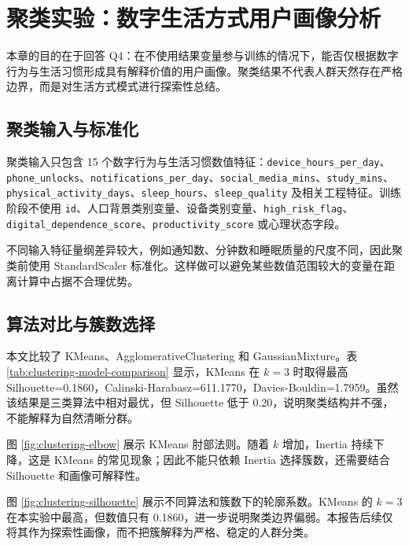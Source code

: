 \section{聚类实验：数字生活方式用户画像分析}

本章的目的在于回答 Q4：在不使用结果变量参与训练的情况下，能否仅根据数字行为与生活习惯形成具有解释价值的用户画像。聚类结果不代表人群天然存在严格边界，而是对生活方式模式进行探索性总结。

\subsection{聚类输入与标准化}

聚类输入只包含 15 个数字行为与生活习惯数值特征：\texttt{device\_hours\_per\_day}、\texttt{phone\_unlocks}、\texttt{notifications\_per\_day}、\texttt{social\_media\_mins}、\texttt{study\_mins}、\texttt{physical\_activity\_days}、\texttt{sleep\_hours}、\texttt{sleep\_quality} 及相关工程特征。训练阶段不使用 \texttt{id}、人口背景类别变量、设备类别变量、\texttt{high\_risk\_flag}、\texttt{digital\_dependence\_score}、\texttt{productivity\_score} 或心理状态字段。

不同输入特征量纲差异较大，例如通知数、分钟数和睡眠质量的尺度不同，因此聚类前使用 StandardScaler 标准化。这样做可以避免某些数值范围较大的变量在距离计算中占据不合理优势。

\subsection{算法对比与簇数选择}

本文比较了 KMeans、AgglomerativeClustering 和 GaussianMixture。表 \ref{tab:clustering-model-comparison} 显示，KMeans 在 $k=3$ 时取得最高 Silhouette=0.1860，Calinski-Harabasz=611.1770，Davies-Bouldin=1.7959。虽然该结果是三类算法中相对最优，但 Silhouette 低于 0.20，说明聚类结构并不强，不能解释为自然清晰分群。



图 \ref{fig:clustering-elbow} 展示 KMeans 肘部法则。随着 $k$ 增加，Inertia 持续下降，这是 KMeans 的常见现象；因此不能只依赖 Inertia 选择簇数，还需要结合 Silhouette 和画像可解释性。


图 \ref{fig:clustering-silhouette} 展示不同算法和簇数下的轮廓系数。KMeans 的 $k=3$ 在本实验中最高，但数值只有 0.1860，进一步说明聚类边界偏弱。本报告后续仅将其作为探索性画像，而不把簇解释为严格、稳定的人群分类。


